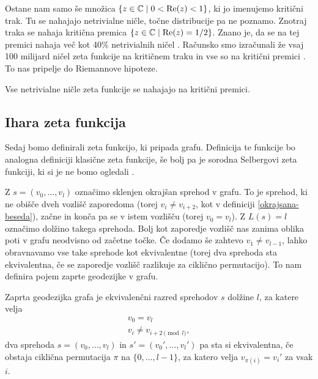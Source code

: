 Ostane nam samo še množica \(\{z\in \mathbb C\mid 0 < \mathrm{Re}(z) < 1\}\), ki jo imenujemo kritični trak. Tu se nahajajo netrivialne ničle, točne distribucije pa ne poznamo. Znotraj traka se nahaja kritična premica \(\{z\in \mathbb C \mid \mathrm{Re}(z) = 1/2\}\). Znano je, da se na tej premici nahaja več kot 40\% netrivialnih ničel \cite{Pratt2019}. Računsko smo izračunali že vsaj 100 milijard ničel zeta funkcije na kritičnem traku in vse so na kritični premici \cite{racunskoniclezeta}. To nas pripelje do Riemannove hipoteze.

\begin{izrek}
    Vse netrivialne ničle zeta funkcije se nahajajo na kritični premici.
\end{izrek}

\subsection{Ihara zeta funkcija}
Sedaj bomo definirali zeta funkcijo, ki pripada grafu. Definicija te funkcije bo analogna definiciji klasične zeta funkcije, še bolj pa je sorodna Selbergovi zeta funkciji, ki si je ne bomo ogledali \cite{sunada-zetagrafov}.

Z \(s=(v_0, \ldots, v_{l})\) označimo sklenjen okrajšan sprehod v grafu. To je sprehod, ki ne obišče dveh vozlišč zaporedoma (torej \(v_i \neq v_{i+2}\), kot v definiciji \ref{okrajsana-beseda}), začne in konča pa se v istem vozlišču (torej \(v_0 = v_l\)). Z \(L(s)=l\) označimo dolžino takega sprehoda. Bolj kot zaporedje vozlišč nas zanima oblika poti v grafu neodvisno od začetne točke. Če dodamo še zahtevo \(v_1 \neq v_{l-1}\), lahko obravnavamo vse take sprehode kot ekvivalentne (torej dva sprehoda sta ekvivalentna, če se zaporedje vozlišč razlikuje za ciklično permutacijo). To nam definira pojem zaprte geodezijke v grafu. 

\begin{definicija}
    Zaprta geodezijka grafa je ekvivalenčni razred sprehodov \(s\) dolžine \(l\), za katere velja
    \begin{align*}
        v_0 = v_l \\
        v_i \neq v_{i+2 \pmod l},
    \end{align*}
    dva sprehoda \(s=(v_0, \ldots, v_{l})\) in \(s'=(v_0', \ldots, v_{l}')\) pa sta si ekvivalentna, če obstaja ciklična permutacija \(\pi\) na \(\{0, \ldots, l-1\}\), za katero velja \(v_{\pi(i)} = v_i'\) za vsak \(i\). 
\end{definicija}

